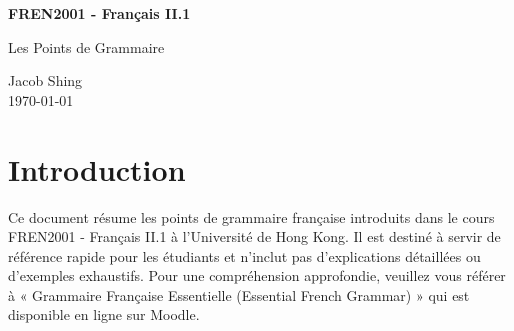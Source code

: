 \documentclass{article}
\begin{document}
\begin{center} 
    {\bfseries\LARGE FREN2001 - Français II.1
    \par\Large Les Points de Grammaire}
    
    \large Jacob Shing \\
    \today
\end{center}

\section*{Introduction}

Ce document résume les points de grammaire française introduits dans le cours FREN2001 - Français II.1
à l'Université de Hong Kong. Il est destiné à servir de référence rapide pour les étudiants
et n'inclut pas d'explications détaillées ou d'exemples exhaustifs. Pour une compréhension approfondie,
veuillez vous référer à « Grammaire Française Essentielle (Essential French Grammar) » qui est disponible
en ligne sur Moodle.


\end{document}
